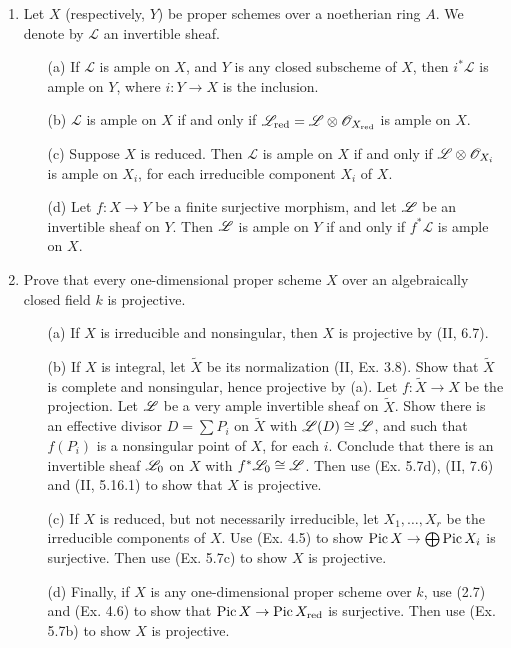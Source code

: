 \documentclass{article}
\begin{document}
\begin{enumerate} [label=\textbf{\arabic*.}, leftmargin=0em]
\item Let $X$ (respectively, $Y$) be proper schemes over a noetherian ring $A$. We denote by $\mathscr{L}$ an invertible sheaf.
\begin{itemize}
  \item[(a)] If $\mathscr{L}$ is ample on $X$, and $Y$ is any closed subscheme of $X$, then $i^* \mathscr{L}$ is ample on $Y$, where $i : Y \to X$ is the inclusion.
  \item[(b)] $\mathscr{L}$ is ample on $X$ if and only if $\mathscr{L}_\text{red} = \mathscr{L} \otimes \mathscr{O}_{X_\text{red}}$ is ample on $X$.
  \item[(c)] Suppose $X$ is reduced. Then $\mathscr{L}$ is ample on $X$ if and only if $\mathscr{L} \otimes \mathscr{O}_{X_i}$ is ample on $X_i$, for each irreducible component $X_i$ of $X$.
  \item[(d)] Let $f : X \to Y$ be a finite surjective morphism, and let $\mathscr{L}$ be an invertible sheaf on $Y$. Then $\mathscr{L}$ is ample on $Y$ if and only if $f^* \mathscr{L}$ is ample on $X$.
\end{itemize}

\item Prove that every one-dimensional proper scheme $X$ over an algebraically closed field $k$ is projective.
\begin{itemize}
  \item[(a)] If $X$ is irreducible and nonsingular, then $X$ is projective by (II, 6.7).
  \item[(b)] If $X$ is integral, let $\tilde{X}$ be its normalization (II, Ex. 3.8). Show that $\tilde{X}$ is complete and nonsingular, hence projective by (a). Let $f : \tilde{X} \to X$ be the projection. Let $\mathscr{L}$ be a very ample invertible sheaf on $\tilde{X}$. Show there is an effective divisor $D = \sum P_i$ on $\tilde{X}$ with $\mathscr{L}(D) \cong \mathscr{L}$, and such that $f(P_i)$ is a nonsingular point of $X$, for each $i$. Conclude that there is an invertible sheaf $\mathscr{L}_0$ on $X$ with $f^* \mathscr{L}_0 \cong \mathscr{L}$. Then use (Ex. 5.7d), (II, 7.6) and (II, 5.16.1) to show that $X$ is projective.
  \item[(c)] If $X$ is reduced, but not necessarily irreducible, let $X_1, \dots, X_r$ be the irreducible components of $X$. Use (Ex. 4.5) to show $\operatorname{Pic}{X} \to \bigoplus \operatorname{Pic}{X_i}$ is surjective. Then use (Ex. 5.7c) to show $X$ is projective.
  \item[(d)] Finally, if $X$ is any one-dimensional proper scheme over $k$, use (2.7) and (Ex. 4.6) to show that $\operatorname{Pic}{X} \to \operatorname{Pic}{X_\text{red}}$ is surjective. Then use (Ex. 5.7b) to show $X$ is projective.
\end{itemize}


\end{enumerate}
\end{document}

